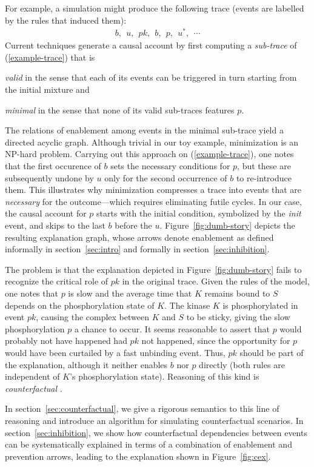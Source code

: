 For example, a simulation might produce the following trace
(events are labelled by the rules that induced them):
\begin{align}
  \label{example-trace} 
  b,\ \ u,\ \ pk,\ \ b,\ \ p,\ \ u^{*},\ \ \cdots
\end{align} 
Current techniques \cite{DBLP:conf/fsttcs/DanosFFHH12,DanosEtAl-CONCUR07}
generate a causal account by first computing a \emph{sub-trace} of
(\ref{example-trace}) that is
\begin{inparaenum}[(i)]
\item \emph{valid} in the sense that each of its events can be
  triggered in turn starting from the initial mixture and
\item \emph{minimal} in the sense that none of its valid sub-traces
  features $p$.
\end{inparaenum}
The relations of enablement among events in the minimal sub-trace yield a directed acyclic graph. Although trivial in our toy example, minimization is an NP-hard problem. Carrying out this approach on (\ref{example-trace}), one notes that the first occurence of $b$ sets the necessary conditions for $p$, but these are subsequently undone by $u$ only for the second occurrence of $b$ to re-introduce them. This illustrates why minimization compresses a trace into events that are \emph{necessary} for the outcome---which requires eliminating futile cycles. In our case, the causal account for $p$ starts with the initial condition, symbolized by the \emph{init} event, and skips to the last $b$ before the $u$. Figure~\ref{fig:dumb-story} depicts the resulting explanation graph, whose arrows denote enablement as defined informally in section~\ref{sec:intro} and formally in section~\ref{sec:inhibition}.



The problem is that the explanation depicted in
Figure~\ref{fig:dumb-story} fails to recognize the critical role of
$pk$ in the original trace. Given the rules of the model, one notes
that $p$ is slow and the average time that $K$ remains bound to $S$
depends on the phosphorylation state of $K$. The kinase $K$ is
phosphorylated in event $pk$, causing the complex between $K$ and $S$
to be sticky, giving the slow phosphorylation $p$ a chance to
occur. It seems reasonable to assert that $p$ would probably not have
happened had $pk$ not happened, since the opportunity for $p$ would
have been curtailed by a fast unbinding event. Thus, $pk$ should be
part of the explanation, although it neither enables $b$ nor $p$
directly (both rules are independent of $K$'s phosphorylation
state). Reasoning of this kind is \emph{counterfactual}
\cite{lewis1974causation,pearl2009causality}.

In section~\ref{sec:counterfactual}, we give a rigorous semantics to
this line of reasoning and introduce an algorithm for simulating
counterfactual scenarios. In section~\ref{sec:inhibition}, we show how
counterfactual dependencies between events can be systematically
explained in terms of a combination of enablement and prevention
arrows, leading to the explanation shown in Figure~\ref{fig:cex}. 
